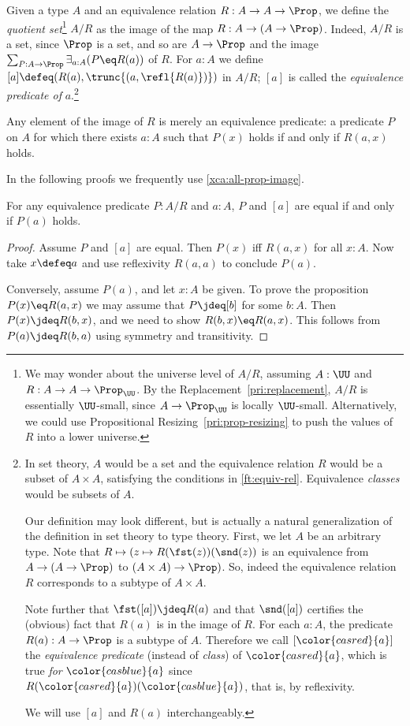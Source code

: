 \begin{definition}\label{def:quotient-set}
Given a type $A$ and an equivalence relation
$R : A \to A \to \Prop$,
we define the \emph{quotient set}\footnote{%
  We may wonder about the universe level of $A/R$,
  assuming $A : \UU$ and $R : A \to A \to \Prop_\UU$.
  By the Replacement~\cref{pri:replacement},
  $A/R$ is essentially $\UU$-small, since $A\to\Prop_\UU$
  is locally $\UU$-small. Alternatively, we could use
  Propositional Resizing~\cref{pri:prop-resizing} to push
  the values of $R$ into a lower universe.}
$A/R$ as the image of the map $R : A \to (A \to \Prop)$.
Indeed, $A/R$ is a set, since $\Prop$ is a set, and so are $A\to\Prop$
and the image $\sum_{P:A\to\Prop}\exists_{a:A}(P\eq R(a))$ of $R$.
For $a:A$ we define $[a] \defeq (R(a),\trunc{(a,\refl{R(a)})})$ in $A/R$;
$[a]$ is called the \emph{equivalence predicate of} $a$.\footnote{%
In set theory, $A$ would be a set and the equivalence relation $R$
would be a subset of $A\times A$, satisfying the conditions
in \cref{ft:equiv-rel}.
Equivalence \emph{classes} would be subsets of $A$.

Our definition may look different, but is actually
a natural generalization of the definition in set theory
to type theory. First, we let $A$ be an arbitrary type.
Note that $R\mapsto(z\mapsto R(\fst(z))(\snd(z))$ is an 
equivalence from $A\to(A\to\Prop)$ to $(A\times A)\to\Prop)$.
So, indeed
the equivalence relation $R$ corresponds to a subtype of $A\times A$.

Note further that $\fst([a])\jdeq R(a)$ and that $\snd([a])$ certifies
the (obvious) fact that $R(a)$ is in the image of $R$.
For each $a:A$, the predicate $R(a): A\to\Prop$ is a subtype of $A$.
Therefore we call $[{\color{casred}{a}}]$ the \emph{equivalence
predicate} (instead of \emph{class}) of ${\color{casred}{a}}$,
which is true \emph{for} ${\color{casblue}{a}}$
since $R({\color{casred}{a}})({\color{casblue}{a}})$,
that is, by reflexivity.

We will use $[a]$ and $R(a)$ interchangeably.}
\end{definition}
Any element of the image of $R$ is merely an equivalence predicate:
a predicate $P$ on $A$ for which there exists $a:A$
such that $P(x)$ holds if and only if $R(a,x)$ holds.

In the following proofs we frequently use \cref{xca:all-prop-image}.

\begin{lemma}\label{lem:equiv-class-prop}
  For any equivalence predicate $P : A/R$ and $a:A$,
  $P$ and $[a]$ are equal if and only if $P(a)$ holds.
\end{lemma}
\begin{proof}
  Assume $P$ and $[a]$ are equal.
  Then $P(x)$ iff $R(a,x)$ for all $x:A$. Now
  take $x\defeq a$ and use reflexivity $R(a,a)$ to conclude $P(a)$.

  Conversely, assume $P(a)$, and let $x:A$ be given.
  To prove the proposition $P(x) \eq R(a,x)$ we may assume that
  $P \jdeq [b]$ for some $b:A$.
  Then $P(x) \jdeq R(b,x)$, and we need to show $R(b,x) \eq R(a,x)$.
  This follows from $P(a) \jdeq R(b,a)$ using symmetry and transitivity.
\end{proof}

